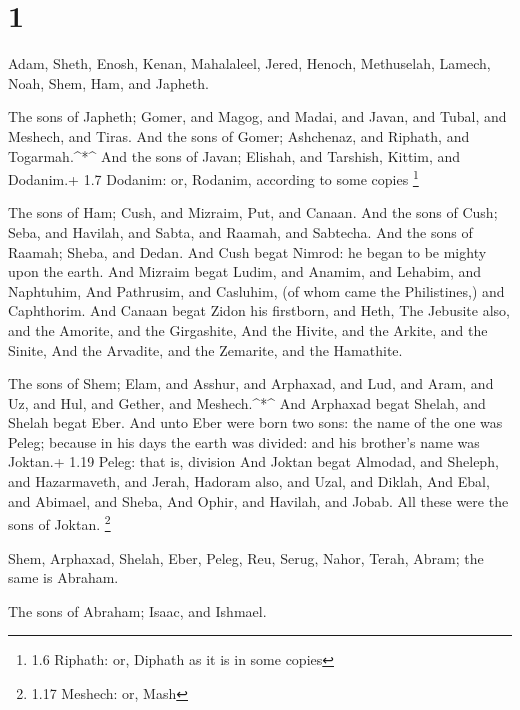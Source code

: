 \hypertarget{section}{%
\section{1}\label{section}}

 Adam, Sheth, Enosh,  Kenan, Mahalaleel, Jered,
 Henoch, Methuselah, Lamech,  Noah, Shem, Ham,
and Japheth.

 The sons of Japheth; Gomer, and Magog, and Madai, and
Javan, and Tubal, and Meshech, and Tiras.  And the sons of
Gomer; Ashchenaz, and Riphath, and Togarmah.\^{}*\^{}  And
the sons of Javan; Elishah, and Tarshish, Kittim, and Dodanim.+ 1.7
Dodanim: or, Rodanim, according to some copies \footnote{1.6 Riphath:
  or, Diphath as it is in some copies}

 The sons of Ham; Cush, and Mizraim, Put, and Canaan.
 And the sons of Cush; Seba, and Havilah, and Sabta, and
Raamah, and Sabtecha. And the sons of Raamah; Sheba, and Dedan.
 And Cush begat Nimrod: he began to be mighty upon the
earth.  And Mizraim begat Ludim, and Anamim, and Lehabim,
and Naphtuhim,  And Pathrusim, and Casluhim, (of whom came
the Philistines,) and Caphthorim.  And Canaan begat Zidon
his firstborn, and Heth,  The Jebusite also, and the
Amorite, and the Girgashite,  And the Hivite, and the
Arkite, and the Sinite,  And the Arvadite, and the
Zemarite, and the Hamathite.

 The sons of Shem; Elam, and Asshur, and Arphaxad, and Lud,
and Aram, and Uz, and Hul, and Gether, and Meshech.\^{}*\^{}
 And Arphaxad begat Shelah, and Shelah begat Eber.
 And unto Eber were born two sons: the name of the one was
Peleg; because in his days the earth was divided: and his brother's name
was Joktan.+ 1.19 Peleg: that is, division  And Joktan
begat Almodad, and Sheleph, and Hazarmaveth, and Jerah, 
Hadoram also, and Uzal, and Diklah,  And Ebal, and Abimael,
and Sheba,  And Ophir, and Havilah, and Jobab. All these
were the sons of Joktan. \footnote{1.17 Meshech: or, Mash}

 Shem, Arphaxad, Shelah,  Eber, Peleg, Reu,
 Serug, Nahor, Terah,  Abram; the same is
Abraham.

 The sons of Abraham; Isaac, and Ishmael.

